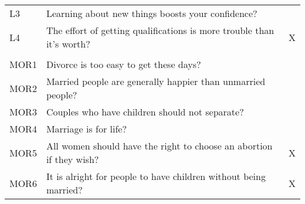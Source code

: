 \begin{tabular}{lll}
\hspace{1em}L3 & Learning about new things boosts your confidence? & \\
\hspace{1em}L4 & The effort of getting qualifications is more trouble than it's worth? & X\\
\addlinespace[0.3em]
\multicolumn{3}{l}{\textbf{Morale (MOR)}}\\
\hline
\hspace{1em}MOR1 & Divorce is too easy to get these days? & \\
\hspace{1em}MOR2 & Married people are generally happier than unmarried people? & \\
\hspace{1em}MOR3 & Couples who have children should not separate? & \\
\hspace{1em}MOR4 & Marriage is for life? & \\
\hspace{1em}MOR5 & All women should have the right to choose an abortion if they wish? & X\\
\hspace{1em}MOR6 & It is alright for people to have children without being married? & X\\
\bottomrule
\end{tabular}
